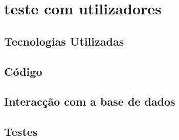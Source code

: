 \chapter{teste com utilizadores}
\label{cap4}


\section{Tecnologias Utilizadas}


\section{Código}


\section{Interacção com a base de dados}


\section{Testes}

